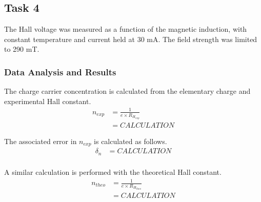 \documentclass[a4paper]{article}
\begin{document}
\subsection{Task 4}

\qq The Hall voltage was measured as a function of the magnetic
induction, with constant temperature and current held at 30 mA. 
The field strength was limited to 290 mT. 

\subsubsection{Data Analysis and Results}

\begin{figure}[H]
\centering
\label{task34plot}
\end{figure}




\qq The charge carrier concentration is calculated from the elementary
charge and experimental Hall constant.
\begin{align*}
n_{exp} &= \frac{1}{e \times R_{H_{exp}}} \\
	&= CALCULATION 
\end{align*}

The associated error in $n_{exp}$ is calculated as follows.
\begin{align*}
\delta_n &= CALCULATION \\
\end{align*}

A similar calculation is performed with the theoretical Hall constant.
\begin{align*}
n_{theo} &= \frac{1}{e \times R_{H_{theo}}} \\
	&= CALCULATION \\
\end{align*}
\end{document}
